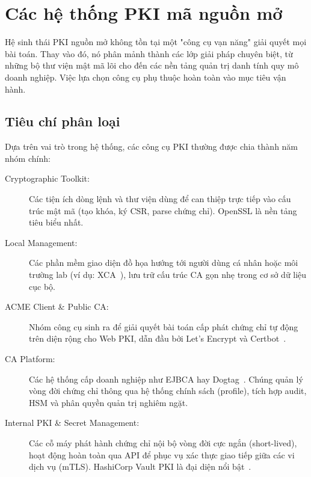 \chapter{Các hệ thống PKI mã nguồn mở}
\label{chap:opensource}

Hệ sinh thái PKI nguồn mở không tồn tại một "công cụ vạn năng" giải quyết mọi bài toán. Thay vào đó, nó phân mảnh thành các lớp giải pháp chuyên biệt, từ những bộ thư viện mật mã lõi cho đến các nền tảng quản trị danh tính quy mô doanh nghiệp. Việc lựa chọn công cụ phụ thuộc hoàn toàn vào mục tiêu vận hành. 

\section{Tiêu chí phân loại}
\label{sec:6.1}

Dựa trên vai trò trong hệ thống, các công cụ PKI thường được chia thành năm nhóm chính:

\begin{description}
    \item[Cryptographic Toolkit:] Các tiện ích dòng lệnh và thư viện dùng để can thiệp trực tiếp vào cấu trúc mật mã (tạo khóa, ký CSR, parse chứng chỉ). OpenSSL là nền tảng tiêu biểu nhất.
    \item[Local Management:] Các phần mềm giao diện đồ họa hướng tới người dùng cá nhân hoặc môi trường lab (ví dụ: XCA~\cite{XCA}), lưu trữ cấu trúc CA gọn nhẹ trong cơ sở dữ liệu cục bộ.
    \item[ACME Client \& Public CA:] Nhóm công cụ sinh ra để giải quyết bài toán cấp phát chứng chỉ tự động trên diện rộng cho Web PKI, dẫn đầu bởi Let's Encrypt và Certbot~\cite{LetsEncryptDocs,CertbotDocs,RFC8555}.
    \item[CA Platform:] Các hệ thống cấp doanh nghiệp như EJBCA hay Dogtag~\cite{EJBCA,DogtagPKI}. Chúng quản lý vòng đời chứng chỉ thông qua hệ thống chính sách (profile), tích hợp audit, HSM và phân quyền quản trị nghiêm ngặt.
    \item[Internal PKI \& Secret Management:] Các cỗ máy phát hành chứng chỉ nội bộ vòng đời cực ngắn (short-lived), hoạt động hoàn toàn qua API để phục vụ xác thực giao tiếp giữa các vi dịch vụ (mTLS). HashiCorp Vault PKI là đại diện nổi bật~\cite{VaultPKI}.
\end{description}

